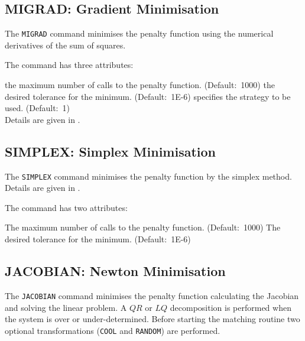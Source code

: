 \subsection{MIGRAD: Gradient Minimisation}
\label{subsec:match-migrad}
The {\tt MIGRAD} command minimises the penalty function using the numerical
derivatives of the sum of squares.  


The command has three attributes: 
\begin{madlist}
    the maximum number of calls to the penalty
   function. (Default:~1000) 
    the desired tolerance for the minimum. 
   (Default:~1E-6)
    specifies the strategy to be used. (Default:~1) \\
   Details are given in \cite{MINUIT}.  
\end{madlist} 

\subsection{SIMPLEX: Simplex Minimisation}
\label{subsec:match-simplex}
The {\tt SIMPLEX} command minimises the penalty function by the simplex
method. Details are given in \cite{MINUIT}.


The command has two attributes: 
\begin{madlist}
    The maximum number of calls to the penalty
   function. (Default:~1000) 
    The desired tolerance for the minimum. 
   (Default:~1E-6)
\end{madlist} 

\subsection{JACOBIAN: Newton Minimisation}
\label{subsec:match-jacobian}
The {\tt JACOBIAN} command minimises the penalty function calculating the
Jacobian and solving the linear problem. A $Q R$ or $L Q$  decomposition is
performed when the system is over or under-determined. Before starting
the matching routine two optional transformations ({\tt COOL} and {\tt RANDOM}) 
are performed. 



